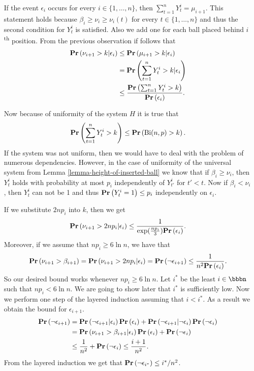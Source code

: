 If the event $\epsilon_i$ occurs for every $i \in \{1, \dots, n\}$, then $\sum_{t = 1}^{n} Y_t^i = \mu_{i + 1}$. This statement holds because $\beta_i \geq \nu_i \geq \nu_i(t)$ for every $t \in \{1, \dots, n\}$ and thus the second condition for $Y_t^i$ is satisfied. Also we add one for each ball placed behind $i$\textsuperscript{th} position. 
From the previous observation if follows that
\[
\begin{split}
\mathbf{Pr}\left(\nu_{i + 1} > k | \epsilon_i\right) 
	& \leq \mathbf{Pr}\left(\mu_{i + 1} > k | \epsilon_i\right) \\
	& = \mathbf{Pr}\left(\displaystyle\sum_{t = 1}^{n} Y_t^{i} > k | \epsilon_i\right) \\
	& \leq \frac{\mathbf{Pr}\left(\sum_{t = 1}^{n} Y_t^{i} > k\right)}{\mathbf{Pr}\left(\epsilon_i\right)}. \\
\end{split}
\]

Now because of uniformity of the system $H$ it is true that $$\mathbf{Pr}\left(\sum_{t = 1}^{n} Y_t^i > k\right) \leq \mathbf{Pr}\left(\mathrm{Bi}(n, p) > k\right).$$ If the system was not uniform, then we would have to deal with the problem of numerous dependencies. However, in the case of uniformity of the universal system from Lemma \ref{lemma-height-of-inserted-ball} we know that if $\beta_i \geq \nu_i$, then $Y_t^i$ holds with probability at most $p_i$ independently of $Y_{t'}^i$ for $t' < t$. Now if $\beta_i < \nu_i$, then $Y_t^i$ can not be 1 and thus $\mathbf{Pr}\left(Y_t^i = 1\right) \leq p_i$ independently on $\epsilon_i$.

If we substitute $2np_i$ into $k$, then we get
\[
\mathbf{Pr}\left(\nu_{i + 1} > 2np_i | \epsilon_i\right) \leq \frac{1}{\exp(\frac{np_i}{3})\mathbf{Pr}\left(\epsilon_i\right)}.
\]
Moreover, if we assume that $np_i \geq 6 \ln n$, we have that 
\[
\mathbf{Pr}\left(\nu_{i + 1} > \beta_{i + 1}\right) = \mathbf{Pr}\left(\nu_{i + 1} > 2np_i | \epsilon_i\right) = \mathbf{Pr}\left(\neg \epsilon_{i + 1}\right) \leq \frac{1}{n ^ 2\mathbf{Pr}\left(\epsilon_i\right)} \textit{.}
\]
So our desired bound works whenever $np_i \geq 6 \ln n$. Let $i^*$ be the least $i \in \bbbn$ such that $np_i < 6 \ln n$. We are going to show later that $i^*$ is sufficiently low. Now we perform one step of the layered induction assuming that $i<i^*$. As a result we obtain the bound for $\epsilon_{i + 1}$.
\[
\begin{split}
\mathbf{Pr}\left(\neg \epsilon_{i + 1}\right) 
	& = \mathbf{Pr}\left(\neg \epsilon_{i + 1} | \epsilon_i\right)\mathbf{Pr}\left(\epsilon_i\right) + \mathbf{Pr}\left(\neg \epsilon_{i + 1} | \neg \epsilon_i\right)\mathbf{Pr}\left(\neg \epsilon_i\right) \\
	& = \mathbf{Pr}\left(\nu_{i + 1} > \beta_{i + 1} | \epsilon_i\right)\mathbf{Pr}\left(\epsilon_i\right) + \mathbf{Pr}\left(\neg \epsilon_i\right) \\
	& \leq \frac{1}{n ^ 2} + \mathbf{Pr}\left(\neg \epsilon_i\right) \leq \frac{i + 1}{n ^ 2} \textit{.}
\end{split} 
\]
From the layered induction we get that $\mathbf{Pr}\left(\neg \epsilon_{i^*}\right) \leq i^* / n^2$. 

